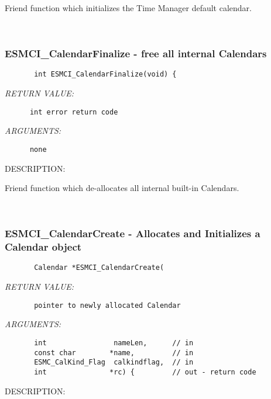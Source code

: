         Friend function which initializes the Time Manager default calendar.
   
 
\mbox{}\hrulefill\
 
\subsubsection [ESMCI\_CalendarFinalize] {ESMCI\_CalendarFinalize - free all internal Calendars}


  
\begin{verbatim}       int ESMCI_CalendarFinalize(void) { \end{verbatim}{\em RETURN VALUE:}
\begin{verbatim}      int error return code\end{verbatim}{\em ARGUMENTS:}
\begin{verbatim}      none\end{verbatim}
{\sf DESCRIPTION:\\ }


        Friend function which de-allocates all internal built-in Calendars.
   
 
\mbox{}\hrulefill\ 
 
\subsubsection [ESMCI\_CalendarCreate] {ESMCI\_CalendarCreate - Allocates and Initializes a Calendar object}


  
\begin{verbatim}       Calendar *ESMCI_CalendarCreate(\end{verbatim}{\em RETURN VALUE:}
\begin{verbatim}       pointer to newly allocated Calendar\end{verbatim}{\em ARGUMENTS:}
\begin{verbatim}       int                nameLen,      // in
       const char        *name,         // in
       ESMC_CalKind_Flag  calkindflag,  // in
       int               *rc) {         // out - return code
 \end{verbatim}
{\sf DESCRIPTION:\\ }


